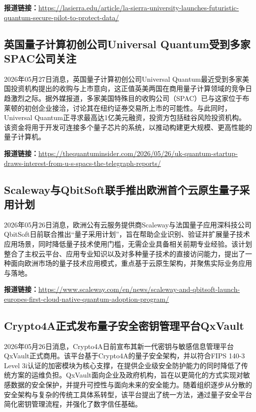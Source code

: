 \documentclass[12pt,a4paper]{ctexart}
\begin{document}
\noindent\textbf{报道链接：}\url{https://lasierra.edu/article/la-sierra-university-launches-futuristic-quantum-secure-pilot-to-protect-data/}

\subsection{ 英国量子计算初创公司Universal Quantum受到多家SPAC公司关注 }

2026年05月27日消息，英国量子计算初创公司Universal Quantum最近受到多家美国投资机构提出的收购与上市意向，这正值英美两国在商用量子计算领域的竞争日趋激烈之际。据外媒报道，多家美国特殊目的收购公司（SPAC）已与这家位于布莱顿的初创企业接洽，讨论其在纽约证券交易所上市的可能性。与此同时，Universal Quantum正寻求最高达1亿美元融资，投资方包括硅谷风险投资机构。该资金将用于开发可连接多个量子芯片的系统，以推动构建更大规模、更高性能的量子计算机。

\noindent\textbf{报道链接：}\url{https://thequantuminsider.com/2026/05/26/uk-quantum-startup-draws-interest-from-u-s-spacs-the-telegraph-reports/}

\subsection{ Scaleway与QbitSoft联手推出欧洲首个云原生量子采用计划 }

2026年05月26日消息，欧洲公有云服务提供商Scaleway与法国量子应用深科技公司QbitSoft日前联合推出“量子采用计划”，旨在帮助企业识别、验证并扩展量子技术应用场景，同时降低量子技术使用门槛，无需企业具备相关前期专业经验。该计划整合了主权云平台、应用专业知识以及对多种量子技术的直接访问能力，提出了一种面向欧洲市场的量子技术应用模式，重点基于云原生架构，并聚焦实际业务应用与落地。

\noindent\textbf{报道链接：}\url{https://www.scaleway.com/en/news/scaleway-and-qbitsoft-launch-europes-first-cloud-native-quantum-adoption-program/}

\subsection{ Crypto4A正式发布量子安全密钥管理平台QxVault }

2026年05月26日消息，Crypto4A日前宣布其新一代密钥与敏感信息管理平台QxVault正式商用。该平台基于Crypto4A的量子安全架构，并以符合FIPS 140-3 Level 3i认证的加密模块为核心支撑，在提供企业级安全防护能力的同时降低了传统方案的运维负担。QxVault面向企业及政府机构，旨在以更简化的方式实现对敏感数据的安全保护，并提升可控性与面向未来的安全能力。随着组织逐步从分散的安全架构与复杂的传统工具体系转型，该平台提出了统一方法，通过量子安全平台简化密钥管理流程，并强化了数字信任基础。
\end{document}
